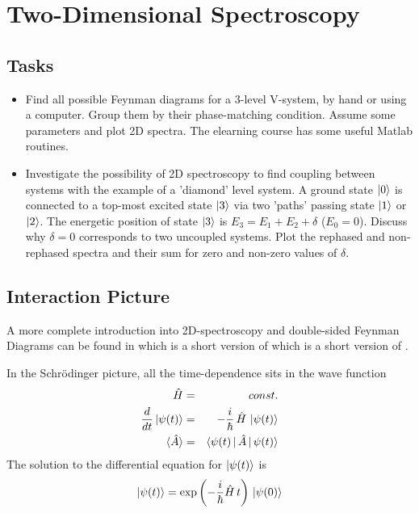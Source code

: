\renewcommand{\lastmod}{July 10, 2020}
\chapter{Two-Dimensional Spectroscopy}


\section{Tasks}

\begin{itemize}
\item Find all possible Feynman diagrams for a 3-level V-system, by hand or using a computer. Group them by their phase-matching condition. Assume some parameters and plot 2D spectra. The elearning course has some useful Matlab routines.

\item Investigate the possibility of 2D spectroscopy to find coupling between systems with the example of a 'diamond' level system. A ground state $\ket{0}$ is connected to a top-most excited state $\ket{3}$ via two 'paths' passing state $\ket{1}$ or $\ket{2}$. The energetic position of state $\ket{3}$ is $E_3 = E_1 + E_2 + \delta$ ($E_0= 0$). Discuss why $\delta = 0$ corresponds to two uncoupled systems. Plot the rephased and non-rephased spectra and their sum for zero and non-zero values of $\delta$.


\end{itemize}

\section{Interaction Picture}

A more complete introduction into 2D-spectroscopy and double-sided Feynman Diagrams can be found in \cite{Hamm-dummies} which is a short version of \cite{HammZanni2011} which is a short version of \cite{Mukamel1995}.


In the Schrödinger picture, all the time-dependence sits in the wave function
\begin{eqnarray}
 \hat{H} & = & const. \\
 \frac{d}{dt} \ket{\psi(t)} &=& - \frac{i}{\hbar} \, \hat{H} \, \ket{\psi(t)} \\
 \braket{\hat{A}} &=& \braket{\psi(t) \, | \,\hat{A} \, |\, \psi(t) } 
\end{eqnarray}
The solution to the differential equation for $\ket{\psi(t)}$ is
\begin{equation}
 \ket{\psi(t)} =  \exp \left(- \frac{i}{\hbar} \hat{H} \, t \right) \,\ket{\psi(0)} 
\end{equation}


